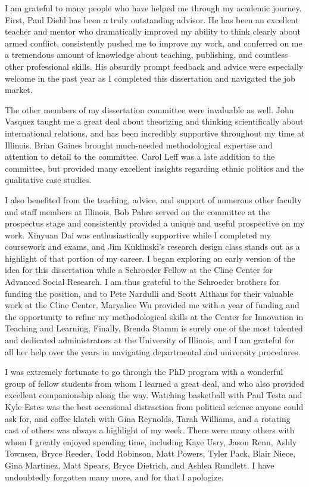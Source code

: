 I am grateful to many people who have helped me through my academic journey. First, Paul Diehl has been a truly outstanding advisor. He has been an excellent teacher and mentor who dramatically improved my ability to think clearly about armed conflict, consistently pushed me to improve my work, and conferred on me a tremendous amount of knowledge about teaching, publishing, and countless other professional skills. His absurdly prompt feedback and advice were especially welcome in the past year as I completed this dissertation and navigated the job market.

The other members of my dissertation committee were invaluable as well. John Vasquez taught me a great deal about theorizing and thinking scientifically about international relations, and has been incredibly supportive throughout my time at Illinois. Brian Gaines brought much-needed methodological expertise and attention to detail to the committee. Carol Leff was a late addition to the committee, but provided many excellent insights regarding ethnic politics and the qualitative case studies. 

I also benefited from the teaching, advice, and support of numerous other faculty and staff members at Illinois. Bob Pahre served on the committee at the prospectus stage and consistently provided a unique and useful prospective on my work. Xinyuan Dai was enthusiastically supportive while I completed my coursework and exams, and Jim Kuklinski's research design class stands out as a highlight of that portion of my career. I began exploring an early version of the idea for this dissertation while a Schroeder Fellow at the Cline Center for Advanced Social Research. I am thus grateful to the Schroeder brothers for funding the position, and to Pete Nardulli and Scott Althaus for their valuable work at the Cline Center. Maryalice Wu provided me with a year of funding and the opportunity to refine my methodological skills at the Center for Innovation in Teaching and Learning. Finally, Brenda Stamm is surely one of the most talented and dedicated administrators at the University of Illinois, and I am grateful for all her help over the years in navigating departmental and university procedures.

I was extremely fortunate to go through the PhD program with a wonderful group of fellow students from whom I learned a great deal, and who also provided excellent companionship along the way. Watching basketball with Paul Testa and Kyle Estes was the best occasional distraction from political science anyone could ask for, and coffee klatch with Gina Reynolds, Tarah Williams, and a rotating cast of others was always a highlight of my week. There were many others with whom I greatly enjoyed spending time, including Kaye Usry, Jason Renn, Ashly Townsen, Bryce Reeder, Todd Robinson, Matt Powers, Tyler Pack, Blair Niece, Gina Martinez, Matt Spears, Bryce Dietrich, and Ashlea Rundlett. I have undoubtedly forgotten many more, and for that I apologize.

